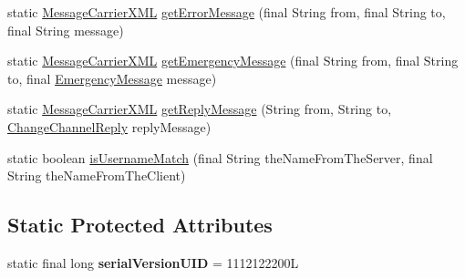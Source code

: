 \begin{DoxyCompactItemize}
\item 
static \hyperlink{classgov_1_1fnal_1_1ppd_1_1dd_1_1xml_1_1MessageCarrierXML}{Message\-Carrier\-X\-M\-L} \hyperlink{classgov_1_1fnal_1_1ppd_1_1dd_1_1xml_1_1MessageCarrierXML_a5159aef548c8c4fe564adc7d7d622305}{get\-Error\-Message} (final String from, final String to, final String message)
\item 
static \hyperlink{classgov_1_1fnal_1_1ppd_1_1dd_1_1xml_1_1MessageCarrierXML}{Message\-Carrier\-X\-M\-L} \hyperlink{classgov_1_1fnal_1_1ppd_1_1dd_1_1xml_1_1MessageCarrierXML_afc3f785fdcedd57435555287b13cae60}{get\-Emergency\-Message} (final String from, final String to, final \hyperlink{classgov_1_1fnal_1_1ppd_1_1dd_1_1emergency_1_1EmergencyMessage}{Emergency\-Message} message)
\item 
static \hyperlink{classgov_1_1fnal_1_1ppd_1_1dd_1_1xml_1_1MessageCarrierXML}{Message\-Carrier\-X\-M\-L} \hyperlink{classgov_1_1fnal_1_1ppd_1_1dd_1_1xml_1_1MessageCarrierXML_ad716b3dd6f81ec1693e0c2b9209b3b83}{get\-Reply\-Message} (String from, String to, \hyperlink{classgov_1_1fnal_1_1ppd_1_1dd_1_1xml_1_1messages_1_1ChangeChannelReply}{Change\-Channel\-Reply} reply\-Message)
\item 
static boolean \hyperlink{classgov_1_1fnal_1_1ppd_1_1dd_1_1xml_1_1MessageCarrierXML_a04d65b843d37b0e9f2e8026ec00b95ff}{is\-Username\-Match} (final String the\-Name\-From\-The\-Server, final String the\-Name\-From\-The\-Client)
\end{DoxyCompactItemize}
\subsection*{Static Protected Attributes}
\begin{DoxyCompactItemize}
\item 
\hypertarget{classgov_1_1fnal_1_1ppd_1_1dd_1_1xml_1_1MessageCarrierXML_addbf53e6678de784e9f2f7a4804c48cf}{static final long {\bfseries serial\-Version\-U\-I\-D} = 1112122200\-L}\label{classgov_1_1fnal_1_1ppd_1_1dd_1_1xml_1_1MessageCarrierXML_addbf53e6678de784e9f2f7a4804c48cf}

\end{DoxyCompactItemize}


